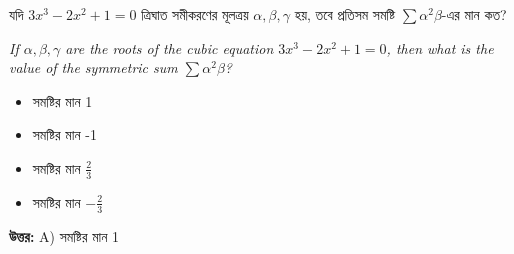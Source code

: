 \documentclass[12pt, a4paper]{article}
\begin{document}
\begin{tcolorbox}[questionbox={প্রশ্ন (Question) 34}]
    \noindent
    যদি $3x^3 - 2x^2 + 1 = 0$ ত্রিঘাত সমীকরণের মূলত্রয় $\alpha, \beta, \gamma$ হয়, তবে প্রতিসম সমষ্টি $\sum \alpha^2 \beta$-এর মান কত?
    
    \vspace{0.8em}
    \begin{english}
    \noindent\textit{\color{darkgray}
    If $\alpha, \beta, \gamma$ are the roots of the cubic equation $3x^3 - 2x^2 + 1 = 0$, then what is the value of the symmetric sum $\sum \alpha^2 \beta$?
    }
    \end{english}
\end{tcolorbox}

\begin{itemize}[label={}, leftmargin=1cm, itemsep=0.5em]
    \item[\textbf{A)}] সমষ্টির মান 1
    \item[\textbf{B)}] সমষ্টির মান -1
    \item[\textbf{C)}] সমষ্টির মান $\frac{2}{3}$
    \item[\textbf{D)}] সমষ্টির মান $-\frac{2}{3}$
\end{itemize}

\vspace{0.5em}
\begin{tcolorbox}[answerbox]
    \textbf{\color{success} উত্তর:} A) সমষ্টির মান 1
\end{tcolorbox}
\vspace{1em}
\end{document}
